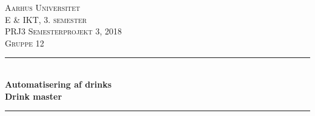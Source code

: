 

\usepackage[utf8]{inputenc}
\usepackage[table,xcdraw]{xcolor}
\usepackage{float}
\usepackage{graphicx}
\usepackage{placeins}
\TabPositions{4cm, 6cm, 8cm}




\newcommand{\HRule}{\rule{\linewidth}{0.5mm}} %

\center %
 

\textsc{\LARGE Aarhus Universitet}\\[1cm] %
\textsc{\Large E \& IKT, 3. semester}\\[0.5cm] %
\textsc{\large PRJ3 Semesterprojekt 3, 2018}\\[0.5cm] %
\textsc{\large Gruppe 12}\\[0.5cm] %


\HRule \\[0.5cm]
{ \huge \bfseries Automatisering af drinks}\\[0.5cm] %
{ \textbf{\Large Drink master}} %
\HRule \\[1cm]

\vfill %

\frontmatter
\tableofcontents*
\mainmatter








